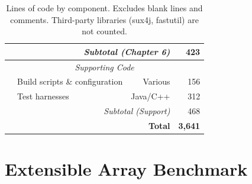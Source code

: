 \begin{table}[H]
\begin{tabular}{|l|l|r|r|}
\hline
\multicolumn{3}{|r|}{\textit{Subtotal (Chapter 6)}} & 423 \\
\hline
\multicolumn{4}{|c|}{\textit{Supporting Code}} \\
\hline
& Build scripts \& configuration & Various & 156 \\
& Test harnesses & Java/C++ & 312 \\
\hline
\multicolumn{3}{|r|}{\textit{Subtotal (Support)}} & 468 \\
\hline
\hline
\multicolumn{3}{|r|}{\textbf{Total}} & \textbf{3,641} \\
\hline
\end{tabular}
\caption{Lines of code by component. Excludes blank lines and comments. Third-party libraries (sux4j, fastutil) are not counted.}
\label{tab:loc}
\end{table}

\section{Extensible Array Benchmark}
\label{sec:ea-benchmark}

